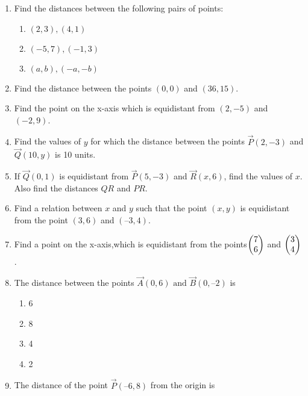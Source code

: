 \begin{enumerate}[label=\thesubsection.\arabic*,ref=\thesubsection.\theenumi]
\item Find the distances between the following pairs of points:
\begin{enumerate}
\item $(2,3),(4,1)$
\item $(-5,7),(-1,3)$
\item $(a,b),(-a,-b)$
\end{enumerate}
		
\item Find the distance between the points $(0,0)$ and $ (36,15)$.
	\\
		\solution
		
\item Find the point on the x-axis which is equidistant from $(2,-5)$ and $(-2,9)$.
	\\
\solution
		
\item Find the values of $y$ for which the distance between the points                  $\vec{P}(2,-3)$ and $\vec{Q}(10,y)$ is 10 units.
\item  If $\vec{Q}(0, 1)$ is equidistant from $\vec{P}(5, -3)$ and $\vec{R}(x, 6)$, find the values of $x$. Also find the
distances $QR$ and $PR$.
\item  Find a relation between $x$ and $y$ such that the point $(x,y)$ is equidistant from the point
$(3, 6)$ and $(– 3, 4)$.
	\\
\solution
		
	\item Find a point on the x-axis,which is equidistant from the points$\begin{pmatrix}
  7 \\
  6 \\
 \end{pmatrix}$ and $\begin{pmatrix}
  3 \\
  4 \\
 \end{pmatrix}$
.
\label{chapters/11/10/1/4}

\item The distance between the points $\vec{A}(0, 6) \text{ and } \vec{B}(0, –2)$ is
	\begin{enumerate}
\item 6
\item 8
\item 4	
\item 2
	\end{enumerate}
\item The distance of the point $\vec{P} (–6, 8)$ from the origin is
\begin{enumerate}


\end{enumerate}
\end{enumerate}
